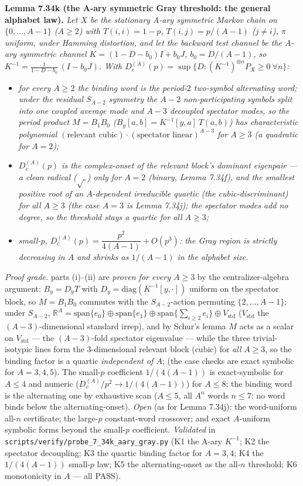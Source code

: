 \documentclass[
]{article}
\begin{document}
\textbf{Lemma 7.34k (the A-ary symmetric Gray threshold: the general alphabet
law).} \emph{Let $X$ be the stationary A-ary symmetric Markov chain on
$\{0,\dots,A-1\}$ ($A\ge2$) with $T(i,i)=1-p$, $T(i,j)=p/(A-1)$ ($j\ne i$),
$\pi$ uniform, under Hamming distortion, and let the backward test channel be
the A-ary symmetric channel $K=(1-D-b_0)I+b_0J$, $b_0=D/(A-1)$, so
$K^{-1}=\tfrac1{1-D-b_0}\,(I-b_0J)$. With $D_c^{(A)}(p)=\sup\{D:(K^{-1})^{\otimes
n}P_X\ge0\ \forall n\}$:}
\begin{itemize}
\item[(i)] \emph{for every $A\ge2$ the binding word is the period-$2$ two-symbol
\emph{alternating} word; under the residual $S_{A-2}$ symmetry the $A-2$
non-participating symbols split into one coupled average mode and $A-3$
decoupled \emph{spectator} modes, so the period product $M=B_1B_0$
($B_y[a,b]=K^{-1}[y,a]\,T(a,b)$) has characteristic polynomial $(\text{relevant
cubic})\cdot(\text{spectator linear})^{A-3}$ for $A\ge3$ (a quadratic for
$A=2$);}
\item[(ii)] \emph{$D_c^{(A)}(p)$ is the complex-onset of the relevant block's
dominant eigenpair --- a clean radical ($\sqrt{\ }$) only for $A=2$ (binary,
Lemma 7.34f), and the smallest positive root of an $A$-dependent
\emph{irreducible quartic} (the cubic-discriminant) for all $A\ge3$ (the case
$A=3$ is Lemma 7.34j); the spectator modes add no degree, so the threshold stays
a quartic for \emph{all} $A\ge3$;}
\item[(iii)] \emph{small-$p$, $D_c^{(A)}(p)=\dfrac{p^2}{4(A-1)}+O(p^3)$: the Gray
region is strictly decreasing in $A$ and shrinks as $1/(A-1)$ in the alphabet
size.}
\end{itemize}
\emph{Proof grade.} parts (i)--(ii) are \emph{proven for every $A\ge3$} by the centralizer-algebra
argument: $B_y=D_yT$ with $D_y=\mathrm{diag}(K^{-1}[y,\cdot])$ uniform on the
spectator block, so $M=B_1B_0$ commutes with the $S_{A-2}$-action permuting
$\{2,\dots,A-1\}$; under $S_{A-2}$, $\mathbb R^A=\mathrm{span}\{e_0\}\oplus
\mathrm{span}\{e_1\}\oplus\mathrm{span}\{\sum_{i\ge2}e_i\}\oplus V_{\mathrm{std}}$
($V_{\mathrm{std}}$ the $(A-3)$-dimensional standard irrep), and by Schur's lemma
$M$ acts as a scalar on $V_{\mathrm{std}}$ --- the $(A-3)$-fold spectator
eigenvalue --- while the three trivial-isotypic lines form the $3$-dimensional
relevant block (cubic) for \emph{all} $A\ge3$, so the binding factor is a quartic
\emph{independent of $A$}; (the case checks are exact symbolic for $A=3,4,5$). The
small-$p$ coefficient $1/(4(A-1))$ is exact-symbolic for $A\le4$ and numeric
($D_c^{(A)}/p^2\to1/(4(A-1))$) for $A\le8$; the binding word is the alternating
one by exhaustive scan ($A\le5$, all $A^n$ words $n\le7$: no word binds below the
alternating-onset). \emph{Open} (as for Lemma 7.34j): the
word-uniform all-$n$ certificate; the large-$p$ constant-word crossover; and
exact $A$-uniform symbolic forms beyond the small-$p$ coefficient.
\emph{Validated} in \texttt{scripts/verify/probe\_7\_34k\_aary\_gray.py} (K1 the
A-ary $K^{-1}$; K2 the spectator decoupling; K3 the quartic binding factor for
$A=3,4$; K4 the $1/(4(A-1))$ small-$p$ law; K5 the alternating-onset as the
all-$n$ threshold; K6 monotonicity in $A$ --- all PASS).
\end{document}
